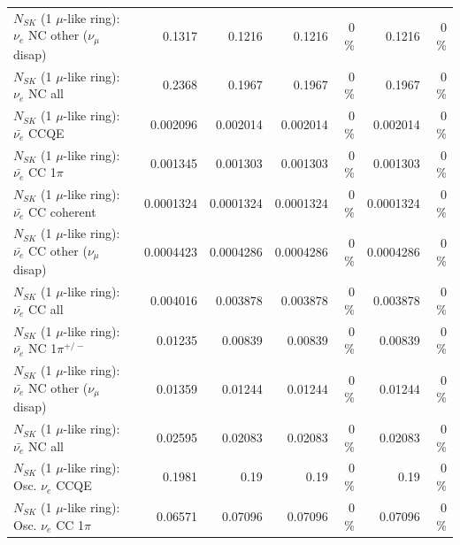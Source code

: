 \begin{table}
\begin{tabular}{| l | r | r | r  r | r  r |}
                $N_{SK}$ (1 $\mu$-like ring): $\nu_e$ NC other ($\nu_\mu$ disap) &          0.1317 &          0.1216 &          0.1216 &        0 \%  &          0.1216 &        0 \%  \\ 
                                  $N_{SK}$ (1 $\mu$-like ring): $\nu_{e}$ NC all &          0.2368 &          0.1967 &          0.1967 &        0 \%  &          0.1967 &        0 \%  \\ 
\hline
\hline
\hline
                                $N_{SK}$ (1 $\mu$-like ring): $\bar{\nu_e}$ CCQE &        0.002096 &        0.002014 &        0.002014 &        0 \%  &        0.002014 &        0 \%  \\ 
                           $N_{SK}$ (1 $\mu$-like ring): $\bar{\nu_e}$ CC 1$\pi$ &        0.001345 &        0.001303 &        0.001303 &        0 \%  &        0.001303 &        0 \%  \\ 
                         $N_{SK}$ (1 $\mu$-like ring): $\bar{\nu_e}$ CC coherent &       0.0001324 &       0.0001324 &       0.0001324 &        0 \%  &       0.0001324 &        0 \%  \\ 
          $N_{SK}$ (1 $\mu$-like ring): $\bar{\nu_e}$ CC other ($\nu_\mu$ disap) &       0.0004423 &       0.0004286 &       0.0004286 &        0 \%  &       0.0004286 &        0 \%  \\ 
                            $N_{SK}$ (1 $\mu$-like ring): $\bar{\nu_{e}}$ CC all &        0.004016 &        0.003878 &        0.003878 &        0 \%  &        0.003878 &        0 \%  \\ 
\hline
                     $N_{SK}$ (1 $\mu$-like ring): $\bar{\nu_e}$ NC 1$\pi^{+/-}$ &         0.01235 &         0.00839 &         0.00839 &        0 \%  &         0.00839 &        0 \%  \\ 
          $N_{SK}$ (1 $\mu$-like ring): $\bar{\nu_e}$ NC other ($\nu_\mu$ disap) &         0.01359 &         0.01244 &         0.01244 &        0 \%  &         0.01244 &        0 \%  \\ 
                            $N_{SK}$ (1 $\mu$-like ring): $\bar{\nu_{e}}$ NC all &         0.02595 &         0.02083 &         0.02083 &        0 \%  &         0.02083 &        0 \%  \\ 
\hline
\hline
\hline
                                 $N_{SK}$ (1 $\mu$-like ring): Osc. $\nu_e$ CCQE &          0.1981 &            0.19 &            0.19 &        0 \%  &            0.19 &        0 \%  \\ 
                            $N_{SK}$ (1 $\mu$-like ring): Osc. $\nu_e$ CC 1$\pi$ &         0.06571 &         0.07096 &         0.07096 &        0 \%  &         0.07096 &        0 \%  \\ 

\end{tabular}
\end{table}
